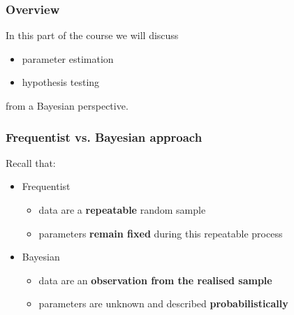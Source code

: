 
\def\mytitle{Part 3: An introduction to Bayesian inference}
\def\mydate{25 March 2015}
\def\myauthor{Matthew Pitkin}
\def\affiliation{University of Glasgow}
\def\latexxslt{beamer}
\def\latexmode{beamer}
\def\event{GraWIToN School}
\def\theme{m}



%


\begin{frame}

\frametitle{Overview}
\label{overview}

In this part of the course we will discuss

\begin{itemize}
\item parameter estimation

\item hypothesis testing

\end{itemize}

from a Bayesian perspective.

\end{frame}

\begin{frame}

\frametitle{Frequentist vs. Bayesian approach}
\label{frequentistvs.bayesianapproach}

Recall that:

\begin{itemize}
\item Frequentist

\begin{itemize}
\item data are a \textbf{repeatable} random sample

\item parameters \textbf{remain fixed} during this repeatable process

\end{itemize}

\item Bayesian

\begin{itemize}
\item data are an \textbf{observation from the realised sample}

\item parameters are unknown and described \textbf{probabilistically}

\end{itemize}

\end{itemize}

\end{frame}

